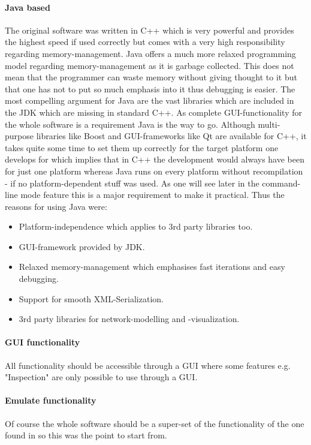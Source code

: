 \documentclass[Bachelorarbeit.tex]{subfiles}
\begin{document}
\paragraph{Java based}
The original software was written in C++ which is very powerful and provides the highest speed if used correctly but comes with a very high responsibility regarding memory-management. Java offers a much more relaxed programming model regarding memory-management as it is garbage collected. This does not mean that the programmer can waste memory without giving thought to it but that one has not to put so much emphasis into it thus debugging is easier.
The most compelling argument for Java are the vast libraries which are included in the JDK which are missing in standard C++. As complete GUI-functionality for the whole software is a requirement Java is the way to go. Although multi-purpose libraries like Boost and GUI-frameworks like Qt are available for C++, it takes quite some time to set them up correctly for the target platform one develops for which implies that in C++ the development would always have been for just one platform whereas Java runs on every platform without recompilation - if no platform-dependent stuff was used. As one will see later in the command-line mode feature this is a major requirement to make it practical. Thus the reasons for using Java were:

\begin{itemize}
\item Platform-independence which applies to 3rd party libraries too.
\item GUI-framework provided by JDK.
\item Relaxed memory-management which emphasises fast iterations and easy debugging.
\item Support for smooth XML-Serialization.
\item 3rd party libraries for network-modelling and -visualization.
\end{itemize}

\paragraph{GUI functionality}
All functionality should be accessible through a GUI where some features e.g. "Inspection" are only possible to use through a GUI.

\paragraph{Emulate \cite{Breuer2015} functionality}
Of course the whole software should be a super-set of the functionality of the one found in \cite{Breuer2015} so this was the point to start from.
\end{document}
